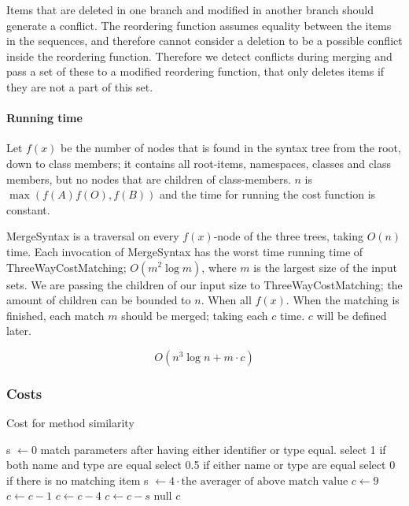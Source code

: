 \documentclass[11pt]{article}
\begin{document}
Items that are deleted in one branch and modified in another branch should generate a conflict. The reordering function assumes equality between the items in the sequences, and therefore cannot consider a deletion to be a possible conflict inside the reordering function. Therefore we detect conflicts during merging and pass a set of these to a modified reordering function, that only deletes items if they are not a part of this set.

\paragraph{Running time} Let $f(x)$ be the number of nodes that is found in the syntax tree from the root, down to class members; it contains all root-items, namespaces, classes and class members, but no nodes that are children of class-members. $n$ is $\max(f(A) f(O), f(B))$ and the time for running the cost function is constant. 

MergeSyntax is a traversal on every $f(x)$-node of the three trees, taking $O(n)$ time. Each invocation of MergeSyntax has the worst time running time of ThreeWayCostMatching; $O(m^2 \log m)$, where $m$ is the largest size of the input sets. We are passing the children of our input size to ThreeWayCostMatching; the amount of children can be bounded to $n$. When all $f(x)$. When the matching is finished, each match $m$ should be merged; taking each $c$ time. $c$ will be defined later.

\begin{equation}
O(n^3 \log n + m \cdot c)  \nonumber
\end{equation}

\subsubsection{Costs}

\begin{algorithm}
\caption{Cost for method similarity}
\label{MethodCostFunction}
\begin{algorithmic}
   \State s $\gets 0$
      \State match parameters after having either identifier or type equal.
	      \State select 1 if both name and type are equal
    	  \State select 0.5 if either name or type are equal
	      \State select 0 if there is no matching item
      \EndFor
      \State s $\gets 4 \cdot \text{the averager of above match value}$
   \EndIf
   \State $c \gets 9$
      \State $c \gets c - 1$
   \EndIf
      \State $c \gets c - 4$
   \EndIf
   \State $c \gets c - s$
         \State \Return null 
   \EndIf
   \State \Return $c$
\EndFunction
\end{algorithmic}
\end{algorithm}
\end{document}
